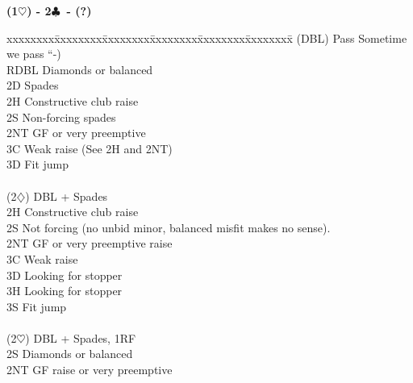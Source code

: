 \documentclass[10pt]{article}
\renewcommand{\c}{$\clubsuit$}
\renewcommand{\d}{$\diamondsuit$}
\newcommand{\h}{$\heartsuit$}
\newcommand{\x}{DBL}
\newenvironment{bidtable}[1][]
{\textbf{#1}
  \begin{adjustwidth}{1em}{}
    \addvspace{2pt}
    \begin{tabbing}
      xxxxxxxx\=xxxxxxxx\=xxxxxxxx\=xxxxxxxx\=xxxxxxxx\=xxxxxxxx\=\kill}
{\end{tabbing}\end{adjustwidth}\bigskip}%
\begin{document}
\begin{multicols*}{2}
\begin{bidtable}[(1\h) - 2\c\ - (?)]
(\x)  \> Pass \> Sometime we pass “-)                                          \\
      \> RDBL \> Diamonds or balanced                                          \\
      \> 2D   \> Spades                                                        \\
      \> 2H   \> Constructive club raise                                       \\
      \> 2S   \> Non-forcing spades                                            \\
      \> 2NT  \> GF or very preemptive                                         \\
      \> 3C   \> Weak raise (See 2H and 2NT)                                   \\
      \> 3D   \> Fit jump                                                      \\
                                                                               \\
(2\d) \> DBL  + Spades                                                     \\
      \> 2H   \> Constructive club raise                                       \\
      \> 2S   \> Not forcing (no unbid minor, balanced misfit makes no sense). \\
      \> 2NT  \> GF or very preemptive raise                                   \\
      \> 3C   \> Weak raise                                                    \\
      \> 3D   \> Looking for stopper                                           \\
      \> 3H   \> Looking for stopper                                           \\
      \> 3S   \> Fit jump                                                      \\
                                                                               \\
(2\h) \> DBL  + Spades, 1RF                                                \\
      \> 2S   \> Diamonds or balanced                                          \\
      \> 2NT  \> GF raise or very preemptive                                   \\

\end{bidtable}
\end{multicols*}
\end{document}

